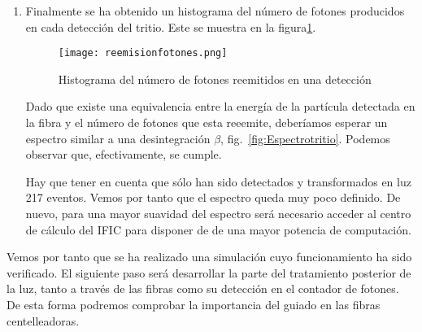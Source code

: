 \begin{enumerate}
\item{} Finalmente se ha obtenido un histograma del número de fotones producidos en cada detección del tritio. Este se muestra en la figura\ref{reemision}.

\begin{figure}[hbtp]
\centering
\texttt{[image: reemisionfotones.png]}
\caption{Histograma del número de fotones reemitidos en una detección \label{reemision}}
\end{figure}

Dado que existe una equivalencia entre la energía de la partícula detectada en la fibra y el número de fotones que esta reeemite, deberíamos esperar un espectro similar a una desintegración $\beta$, fig.~\ref{fig:Espectrotritio}. Podemos observar que, efectivamente, se cumple.

Hay que tener en cuenta que sólo han sido detectados y transformados en luz 217 eventos. Vemos por tanto que el espectro queda muy poco definido. De nuevo, para una mayor suavidad del espectro será necesario acceder al centro de cálculo del IFIC para disponer de de una mayor potencia de computación.
\end{enumerate}

Vemos por tanto que se ha realizado una simulación cuyo funcionamiento ha sido verificado. El siguiente paso será desarrollar la parte del tratamiento posterior de la luz, tanto a través de las fibras como su detección en el contador de fotones. De esta forma podremos comprobar la importancia del guiado en las fibras centelleadoras.